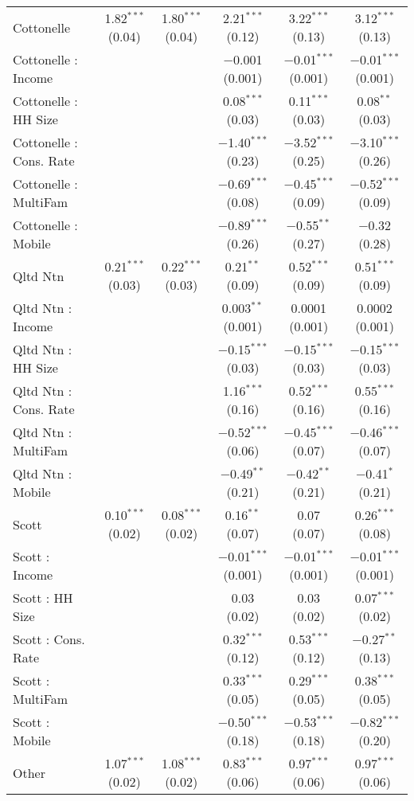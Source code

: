 \begin{table}[!htbp]
\begin{tabular}{@{\extracolsep{5pt}}lccccc}
  Cottonelle & 1.82$^{***}$ (0.04) & 1.80$^{***}$ (0.04) & 2.21$^{***}$ (0.12) & 3.22$^{***}$ (0.13) & 3.12$^{***}$ (0.13) \\ 
  Cottonelle : Income &  &  & $-$0.001 (0.001) & $-$0.01$^{***}$ (0.001) & $-$0.01$^{***}$ (0.001) \\ 
  Cottonelle : HH Size &  &  & 0.08$^{***}$ (0.03) & 0.11$^{***}$ (0.03) & 0.08$^{**}$ (0.03) \\ 
  Cottonelle : Cons. Rate &  &  & $-$1.40$^{***}$ (0.23) & $-$3.52$^{***}$ (0.25) & $-$3.10$^{***}$ (0.26) \\ 
  Cottonelle : MultiFam &  &  & $-$0.69$^{***}$ (0.08) & $-$0.45$^{***}$ (0.09) & $-$0.52$^{***}$ (0.09) \\ 
  Cottonelle : Mobile &  &  & $-$0.89$^{***}$ (0.26) & $-$0.55$^{**}$ (0.27) & $-$0.32 (0.28) \\ 
  Qltd Ntn & 0.21$^{***}$ (0.03) & 0.22$^{***}$ (0.03) & 0.21$^{**}$ (0.09) & 0.52$^{***}$ (0.09) & 0.51$^{***}$ (0.09) \\ 
  Qltd Ntn : Income &  &  & 0.003$^{**}$ (0.001) & 0.0001 (0.001) & 0.0002 (0.001) \\ 
  Qltd Ntn : HH Size &  &  & $-$0.15$^{***}$ (0.03) & $-$0.15$^{***}$ (0.03) & $-$0.15$^{***}$ (0.03) \\ 
  Qltd Ntn : Cons. Rate &  &  & 1.16$^{***}$ (0.16) & 0.52$^{***}$ (0.16) & 0.55$^{***}$ (0.16) \\ 
  Qltd Ntn : MultiFam &  &  & $-$0.52$^{***}$ (0.06) & $-$0.45$^{***}$ (0.07) & $-$0.46$^{***}$ (0.07) \\ 
  Qltd Ntn : Mobile &  &  & $-$0.49$^{**}$ (0.21) & $-$0.42$^{**}$ (0.21) & $-$0.41$^{*}$ (0.21) \\ 
  Scott & 0.10$^{***}$ (0.02) & 0.08$^{***}$ (0.02) & 0.16$^{**}$ (0.07) & 0.07 (0.07) & 0.26$^{***}$ (0.08) \\ 
  Scott : Income &  &  & $-$0.01$^{***}$ (0.001) & $-$0.01$^{***}$ (0.001) & $-$0.01$^{***}$ (0.001) \\ 
  Scott : HH Size &  &  & 0.03 (0.02) & 0.03 (0.02) & 0.07$^{***}$ (0.02) \\ 
  Scott : Cons. Rate &  &  & 0.32$^{***}$ (0.12) & 0.53$^{***}$ (0.12) & $-$0.27$^{**}$ (0.13) \\ 
  Scott : MultiFam &  &  & 0.33$^{***}$ (0.05) & 0.29$^{***}$ (0.05) & 0.38$^{***}$ (0.05) \\ 
  Scott : Mobile &  &  & $-$0.50$^{***}$ (0.18) & $-$0.53$^{***}$ (0.18) & $-$0.82$^{***}$ (0.20) \\ 
  Other & 1.07$^{***}$ (0.02) & 1.08$^{***}$ (0.02) & 0.83$^{***}$ (0.06) & 0.97$^{***}$ (0.06) & 0.97$^{***}$ (0.06) \\ 

\end{tabular}
\end{table}
